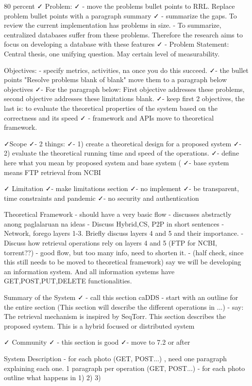 80 percent ✓ Problem:
✓ - move the problems bullet points to RRL. Replace problem bullet points with a paragraph summary 
✓ - summarize the gaps. To review the current implementation has problems in size.
- To summarize, centralized databases suffer from these problems. Therefore the research aims to focus on developing a database with these features
✓ - Problem Statement: Central thesis, one unifying question. May certain level of measurability.

Objectives:
- specify metrics, activities, na once you do this succeed.
✓- the bullet points "Resolve problems blank of blank" move them to a paragraph below objectives
✓- For the paragraph below: First objective addresses these problems, second objective addresses these limitations blank.
✓- keep first 2 objectives, the last is: to evaluate the theoretical properties of the system based on the correctness and its speed
✓ - framework and APIs move to theoretical framework. 


✓Scope
✓- 2 things: 
✓- 1) create a theoretical design for a proposed system
✓- 2) evaluate the theoretical running time and speed of the operations.
✓- define here what you mean by proposed system and base system (
✓- base system means FTP retrieval from NCBI

✓ Limitation
✓- make limitations section
✓- no implement
✓- be transparent, time constraints and pandemic
✓- no security and authentication


Theoretical Framework
- should have a very basic flow
- discusses abstractly anong paglalaruan na ideas
- Discuss Hybrid,CS, P2P in short sentences
- Network, forego layers 1-3. Briefly discuss layers 4 and 5 and their importance.
- Discuss how retrieval operations rely on layers 4 and 5 (FTP for NCBI, torrent??)
- good flow, but too many info, need to shorten it.
- (half check, since this still needs to be moved to theoretical framework) say we will be developing an information system. And all information systems have GET,POST,PUT,DELETE functionalities.


Summary of the System
✓ - call this section caDDS
- start with an outline for the entire section (This section will describe the different operations in ...)
- say: The retrieval mechanism is inspired by SeqTorr. This section describes the proposed system. This is a hybrid focused or distributed system

✓ Community
✓ - this section is good
✓- move to 7.2 or after

System Description
- for each photo (GET, POST...) , need one paragraph explaining each one. 1 paragraph per operation (GET, POST...)
- for each photo outline what happens in 1) 2) 3)


